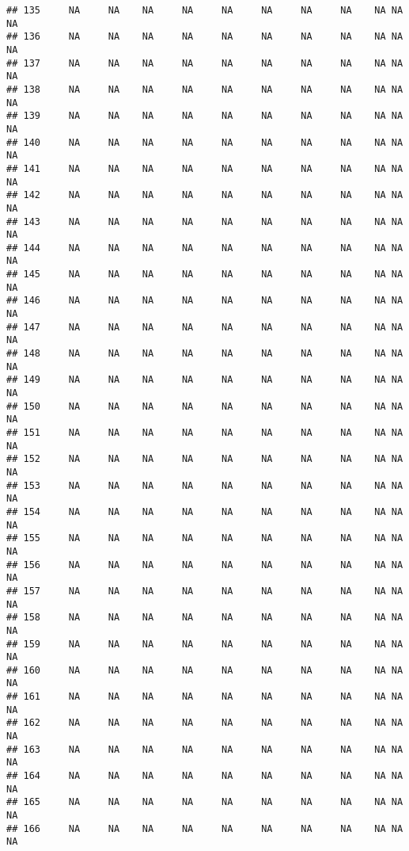 \documentclass[]{article}
\begin{document}
\begin{verbatim}
## 135     NA     NA    NA     NA     NA     NA     NA     NA    NA NA          NA
## 136     NA     NA    NA     NA     NA     NA     NA     NA    NA NA          NA
## 137     NA     NA    NA     NA     NA     NA     NA     NA    NA NA          NA
## 138     NA     NA    NA     NA     NA     NA     NA     NA    NA NA          NA
## 139     NA     NA    NA     NA     NA     NA     NA     NA    NA NA          NA
## 140     NA     NA    NA     NA     NA     NA     NA     NA    NA NA          NA
## 141     NA     NA    NA     NA     NA     NA     NA     NA    NA NA          NA
## 142     NA     NA    NA     NA     NA     NA     NA     NA    NA NA          NA
## 143     NA     NA    NA     NA     NA     NA     NA     NA    NA NA          NA
## 144     NA     NA    NA     NA     NA     NA     NA     NA    NA NA          NA
## 145     NA     NA    NA     NA     NA     NA     NA     NA    NA NA          NA
## 146     NA     NA    NA     NA     NA     NA     NA     NA    NA NA          NA
## 147     NA     NA    NA     NA     NA     NA     NA     NA    NA NA          NA
## 148     NA     NA    NA     NA     NA     NA     NA     NA    NA NA          NA
## 149     NA     NA    NA     NA     NA     NA     NA     NA    NA NA          NA
## 150     NA     NA    NA     NA     NA     NA     NA     NA    NA NA          NA
## 151     NA     NA    NA     NA     NA     NA     NA     NA    NA NA          NA
## 152     NA     NA    NA     NA     NA     NA     NA     NA    NA NA          NA
## 153     NA     NA    NA     NA     NA     NA     NA     NA    NA NA          NA
## 154     NA     NA    NA     NA     NA     NA     NA     NA    NA NA          NA
## 155     NA     NA    NA     NA     NA     NA     NA     NA    NA NA          NA
## 156     NA     NA    NA     NA     NA     NA     NA     NA    NA NA          NA
## 157     NA     NA    NA     NA     NA     NA     NA     NA    NA NA          NA
## 158     NA     NA    NA     NA     NA     NA     NA     NA    NA NA          NA
## 159     NA     NA    NA     NA     NA     NA     NA     NA    NA NA          NA
## 160     NA     NA    NA     NA     NA     NA     NA     NA    NA NA          NA
## 161     NA     NA    NA     NA     NA     NA     NA     NA    NA NA          NA
## 162     NA     NA    NA     NA     NA     NA     NA     NA    NA NA          NA
## 163     NA     NA    NA     NA     NA     NA     NA     NA    NA NA          NA
## 164     NA     NA    NA     NA     NA     NA     NA     NA    NA NA          NA
## 165     NA     NA    NA     NA     NA     NA     NA     NA    NA NA          NA
## 166     NA     NA    NA     NA     NA     NA     NA     NA    NA NA          NA

\end{verbatim}
\end{document}
